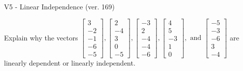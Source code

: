 \begin{exercise}
  \begin{exerciseTitle}V5 - Linear Independence (ver. 169)\end{exerciseTitle}
  \begin{exerciseStatement}
    Explain why the vectors \(\left[\begin{array}{r}
3 \\
-2 \\
-1 \\
-6 \\
-5
\end{array}\right] , \left[\begin{array}{r}
2 \\
-4 \\
3 \\
0 \\
-5
\end{array}\right] , \left[\begin{array}{r}
-3 \\
2 \\
-4 \\
-4 \\
-6
\end{array}\right] , \left[\begin{array}{r}
4 \\
5 \\
-3 \\
1 \\
0
\end{array}\right] , \text{ and } \left[\begin{array}{r}
-5 \\
-3 \\
-6 \\
3 \\
-4
\end{array}\right]\) are linearly dependent or linearly independent.	



\end{exerciseStatement}
\end{exercise}
